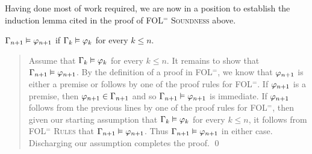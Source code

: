 Having done most of work required, we are now in a position to establish the induction lemma cited in the proof of \textsc{FOL$^=$ Soundness} above.





\begin{Lthm} \label{lemma:FOL-soundness-ind}
  $\Gamma_{n+1} \vDash \varphi_{n+1}$ if $\Gamma_k \vDash \varphi_k$ for every $k\leq n$.
\end{Lthm}
\vspace{-.2in}

\begin{quote}
  Assume that $\Gamma_k \vDash \varphi_k$ for every $k\leq n$. 
  It remains to show that $\Gamma_{n+1} \vDash \varphi_{n+1}$.
  By the definition of a proof in FOL$^=$, we know that $\varphi_{n+1}$ is either a premise or follows by one of the proof rules for FOL$^=$. 
  If $\varphi_{n+1}$ is a premise, then $\varphi_{n+1} \in \Gamma_{n+1}$ and so $\Gamma_{n+1} \vDash \varphi_{n+1}$ is immediate.
  If $\varphi_{n+1}$ follows from the previous lines by one of the proof rules for FOL$^=$, then given our starting assumption that $\Gamma_k \vDash \varphi_k$ for every $k\leq n$, it follows from \textsc{FOL$^=$ Rules} that $\Gamma_{n+1} \vDash \varphi_{n+1}$.
  Thus $\Gamma_{n+1} \vDash \varphi_{n+1}$ in either case.
  Discharging our assumption completes the proof.
  \qed
\end{quote}


